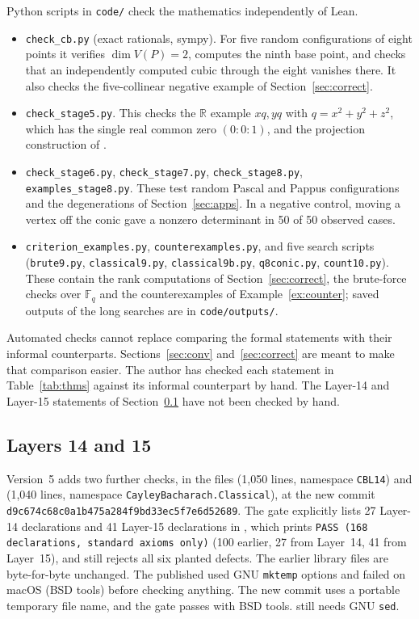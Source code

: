 \documentclass[11pt]{article}
\theoremstyle{definition}
\theoremstyle{remark}
\newcommand{\lean}[1]{\texttt{#1}}
\newcommand{\F}{\mathbb{F}}
\begin{document}
Python scripts in \texttt{code/} check the mathematics independently of Lean.
\begin{itemize}
\item \texttt{check\_cb.py} (exact rationals, sympy). For five random configurations of eight
points it verifies $\dim V(P)=2$, computes the ninth base point, and checks that an independently
computed cubic through the eight vanishes there. It also checks the five-collinear negative
example of Section~\ref{sec:correct}.
\item \texttt{check\_stage5.py}. This checks the $\mathbb{R}$ example $x q, y q$ with
$q=x^2+y^2+z^2$, which has the single real common zero $(0:0:1)$, and the projection construction
of .
\item \texttt{check\_stage6.py}, \texttt{check\_stage7.py}, \texttt{check\_stage8.py},
\texttt{examples\_stage8.py}. These test random Pascal and Pappus configurations and the
degenerations of Section~\ref{sec:apps}. In a negative control, moving a vertex off the conic gave a
nonzero determinant in 50 of 50 observed cases.
\item \texttt{criterion\_examples.py}, \texttt{counterexamples.py}, and five search scripts
(\texttt{brute9.py}, \texttt{classical9.py}, \texttt{classical9b.py}, \texttt{q8conic.py},
\texttt{count10.py}). These contain the rank computations of Section~\ref{sec:correct}, the brute-force checks over $\F_q$ and
the counterexamples of Example~\ref{ex:counter}; saved outputs of the long searches are in
\texttt{code/outputs/}.
\end{itemize}
Automated checks cannot replace comparing the formal statements with their informal
counterparts. Sections~\ref{sec:conv} and~\ref{sec:correct} are meant to make that comparison
easier.
The author has checked each statement in Table~\ref{tab:thms} against its informal counterpart by hand.
The Layer-14 and Layer-15 statements of Section~\ref{sec:l1415} have not been checked by hand.

\subsection{Layers 14 and 15}\label{sec:l1415}

Version~5 adds two further checks, in the files  (1{,}050 lines,
namespace \lean{CBL14}) and  (1{,}040 lines, namespace
\lean{CayleyBacharach.Classical}), at the new commit \texttt{d9c674c68c0a1b475a284f9bd33ec5f7e6d52689}. The gate explicitly lists 27 Layer-14
declarations and 41 Layer-15 declarations in , which prints \texttt{PASS (168 declarations, standard axioms only)}
(100 earlier, 27 from Layer~14, 41 from Layer~15), and  still rejects all six
planted defects. The earlier library files are byte-for-byte unchanged. The published 
used GNU \lean{mktemp} options and failed on macOS (BSD tools) before checking anything. The new commit
uses a portable temporary file name, and the gate passes with BSD tools.  still
needs GNU \lean{sed}.
\end{document}
